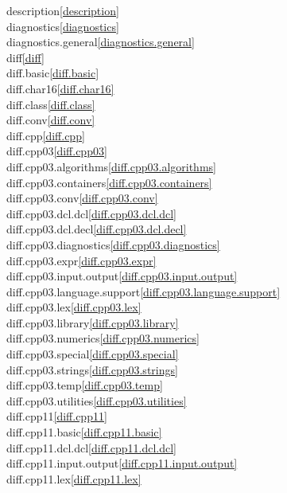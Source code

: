 \begin{multicols}{2}
description\quad\ref{description}\\
diagnostics\quad\ref{diagnostics}\\
diagnostics.general\quad\ref{diagnostics.general}\\
diff\quad\ref{diff}\\
diff.basic\quad\ref{diff.basic}\\
diff.char16\quad\ref{diff.char16}\\
diff.class\quad\ref{diff.class}\\
diff.conv\quad\ref{diff.conv}\\
diff.cpp\quad\ref{diff.cpp}\\
diff.cpp03\quad\ref{diff.cpp03}\\
diff.cpp03.algorithms\quad\ref{diff.cpp03.algorithms}\\
diff.cpp03.containers\quad\ref{diff.cpp03.containers}\\
diff.cpp03.conv\quad\ref{diff.cpp03.conv}\\
diff.cpp03.dcl.dcl\quad\ref{diff.cpp03.dcl.dcl}\\
diff.cpp03.dcl.decl\quad\ref{diff.cpp03.dcl.decl}\\
diff.cpp03.diagnostics\quad\ref{diff.cpp03.diagnostics}\\
diff.cpp03.expr\quad\ref{diff.cpp03.expr}\\
diff.cpp03.input.output\quad\ref{diff.cpp03.input.output}\\
diff.cpp03.language.support\quad\ref{diff.cpp03.language.support}\\
diff.cpp03.lex\quad\ref{diff.cpp03.lex}\\
diff.cpp03.library\quad\ref{diff.cpp03.library}\\
diff.cpp03.numerics\quad\ref{diff.cpp03.numerics}\\
diff.cpp03.special\quad\ref{diff.cpp03.special}\\
diff.cpp03.strings\quad\ref{diff.cpp03.strings}\\
diff.cpp03.temp\quad\ref{diff.cpp03.temp}\\
diff.cpp03.utilities\quad\ref{diff.cpp03.utilities}\\
diff.cpp11\quad\ref{diff.cpp11}\\
diff.cpp11.basic\quad\ref{diff.cpp11.basic}\\
diff.cpp11.dcl.dcl\quad\ref{diff.cpp11.dcl.dcl}\\
diff.cpp11.input.output\quad\ref{diff.cpp11.input.output}\\
diff.cpp11.lex\quad\ref{diff.cpp11.lex}\\

\end{multicols}
